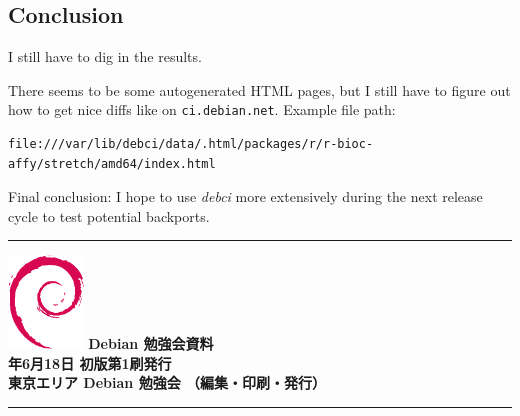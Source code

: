 \documentclass[mingoth,a4paper]{jsarticle}
\newcommand{\debmtgyear}{2017}
\newcommand{\debmtgmonth}{6}
\newcommand{\debmtgdate}{18}
\begin{document}
\subsection{Conclusion}\label{conclusion}

I still have to dig in the results.

There seems to be some autogenerated HTML pages, but I still have to
figure out how to get nice diffs like on \texttt{ci.debian.net}. Example
file path:

\begin{verbatim}
file:///var/lib/debci/data/.html/packages/r/r-bioc-affy/stretch/amd64/index.html
\end{verbatim}

Final conclusion: I hope to use \emph{debci} more extensively during the
next release cycle to test potential backports.

%
\mbox{}\newpage
\mbox{}\newpage
\mbox{}\newpage


\vspace*{15cm}
\hrule
\vspace{2mm}
\includegraphics[width=2cm]{image200502/openlogo-nd.eps}
\noindent \Large \bf Debian 勉強会資料\\
\noindent \normalfont \debmtgyear{}年\debmtgmonth{}月\debmtgdate{}日 \hspace{5mm}  初版第1刷発行\\
\noindent \normalfont 東京エリア Debian 勉強会 （編集・印刷・発行）\\
\hrule
\end{document}
